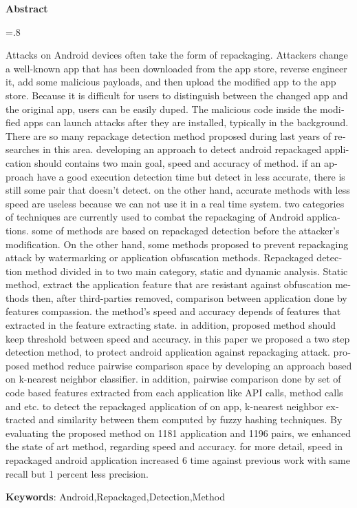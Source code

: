 


\pagestyle{empty}

\begin{latin}

\begin{center}
\textbf{Abstract}
\end{center}
\baselineskip=.8\baselineskip

Attacks on Android devices often take the form of repackaging. Attackers change a well-known app that has been downloaded from the app store, reverse engineer it, add some malicious payloads, and then upload the modified app to the app store. Because it is difficult for users to distinguish between the changed app and the original app, users can be easily duped. The malicious code inside the modified apps can launch attacks after they are installed, typically in the background. There are so many repackage detection method proposed during last years of researches in this area. developing an approach to detect android repackaged application should contains two main goal, speed and accuracy of method. if an approach have a good execution detection time but detect in less accurate, there is still some pair that doesn't detect. on the other hand, accurate methods with less speed are useless because we can not use it in a real time system. two categories of techniques are currently used to combat the repackaging of Android applications. some of methods are based on repackaged detection before the attacker's modification. On the other hand, some methods proposed to prevent repackaging attack by watermarking or application obfuscation methods. Repackaged detection method divided in to two main category, static and dynamic analysis. Static method, extract the application feature that are resistant against obfuscation methods then, after third-parties removed, comparison between application done by features compassion. the method's speed and accuracy depends of features that extracted in the  feature extracting state. in addition, proposed method should keep threshold between speed and accuracy. in this paper we proposed a two step detection method, to protect android application against repackaging attack. proposed method reduce pairwise comparison space by developing an approach based on k-nearest neighbor classifier. in addition, pairwise comparison done by set of  code based features extracted from each application like API calls, method calls and etc. to detect the repackaged application of on app, k-nearest neighbor extracted and similarity between them computed by fuzzy hashing techniques. By evaluating the proposed method on 1181 application and 1196 pairs, we enhanced the state of art method, regarding speed and accuracy. for more detail, speed in repackaged android application increased 6 time against previous work with same recall but 1 percent less precision.

\bigskip\noindent\textbf{Keywords}:
Android,Repackaged,Detection,Method

\end{latin}

